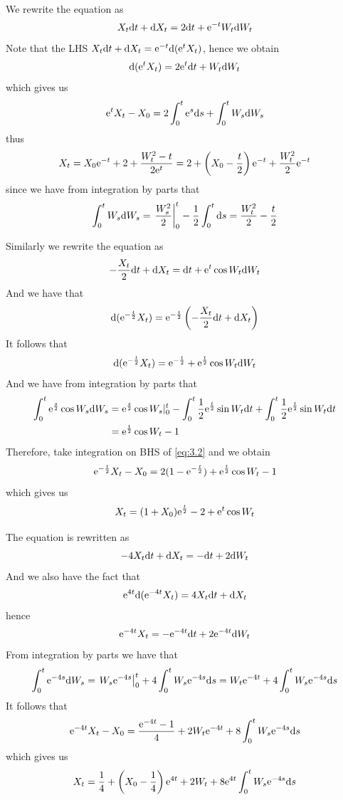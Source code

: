 \documentclass{homework}
\begin{document}
    \problem
    \begin{subproblem}[(3.\arabic*)]
        \item
        We rewrite the equation as
        \[X_t\mathrm d t+\mathrm d X_t=2\mathrm d t+\mathrm e^{-t}W_t\mathrm d W_t\]
        Note that the LHS $X_t\mathrm d t+\mathrm d X_t=\mathrm e^{-t}\mathrm d (\mathrm e^tX_t)$,
        hence we obtain
        \[\mathrm d (\mathrm e^t X_t)=2\mathrm e^t\mathrm d t+W_t\mathrm d W_t\]
        which gives us
        \[\mathrm e^tX_t-X_0=2\int_0^t\mathrm e^s\mathrm d s+\int_0^tW_s\mathrm d W_s\]
        thus
        \[X_t=X_0\mathrm e^{-t}+2+\frac{W_t^2-t}{2\mathrm e^t}
        =2+\left(X_0-\frac{t}{2}\right)\mathrm e^{-t}+\frac{W_t^2}{2}\mathrm e^{-t}\]
        since we have from integration by parts that
        \[\int_0^tW_s\mathrm d W_s=\left.\frac{W_s^2}{2}\right|_0^t
        -\frac{1}{2}\int_0^t\mathrm d s=\frac{W_t^2}{2}-\frac{t}{2}\]
       
        \item
        Similarly we rewrite the equation as
        \[-\frac{X_t}{2}\mathrm d t+\mathrm d X_t=\mathrm d t+\mathrm e^t\cos W_t\mathrm d W_t\]
        And we have that
        \[\mathrm d(\mathrm e^{-\frac{t}{2}}X_t)
        =\mathrm e^{-\frac{t}{2}}\left(-\frac{X_t}{2}\mathrm d t+\mathrm d X_t\right)\]
        It follows that
        \begin{equation}
            \label{eq:3.2}    
            \mathrm d (\mathrm e^{-\frac{t}{2}}X_t)=\mathrm e^{-\frac{t}{2}}+\mathrm e^{\frac{t}{2}}\cos W_t\mathrm d W_t
        \end{equation}
        And we have from integration by parts that
        \[\begin{aligned}
            \int_0^t\mathrm e^{\frac{s}{2}}\cos W_s\mathrm d W_s
            &=\mathrm e^{\frac{s}{2}}\cos W_s|_0^t
            -\int_0^t\frac{1}{2}\mathrm e^{\frac{t}{2}}\sin W_t\mathrm d t
            +\int_0^t\frac{1}{2}\mathrm e^{\frac{t}{2}}\sin W_t\mathrm d t\\
            &=\mathrm e^{\frac{t}{2}}\cos W_t-1
        \end{aligned}\]
        Therefore, take integration on BHS of \cref{eq:3.2} and we obtain
        \[\mathrm e^{-\frac{t}{2}}X_t-X_0=2(1-\mathrm e^{-\frac{t}{2}})+\mathrm e^{\frac{t}{2}}\cos W_t-1\]
        which gives us
        \[X_t=(1+X_0)\mathrm e^{\frac{t}{2}}-2+\mathrm e^t\cos W_t\]
        
        \item
        The equation is rewritten as
        \[-4X_t\mathrm d t+\mathrm d X_t=-\mathrm d t+2\mathrm d W_t\]
        And we also have the fact that
        \[\mathrm e^{4t}\mathrm d(\mathrm e^{-4t}X_t)=4X_t\mathrm d t+\mathrm d X_t\]
        hence
        \[\mathrm e^{-4t}X_t=-\mathrm e^{-4t}\mathrm d t+2\mathrm e^{-4t}\mathrm d W_t\]
        From integration by parts we have that
        \[\int_0^t\mathrm e^{-4s}\mathrm d W_s=\left.W_s\mathrm e^{-4s}\right|_0^t
        +4\int_0^tW_s\mathrm e^{-4s}\mathrm d s
        =W_t\mathrm e^{-4t}+4\int_0^tW_s\mathrm e^{-4s}\mathrm d s\]
        It follows that
        \[\mathrm e^{-4t}X_t-X_0=\frac{\mathrm e^{-4t}-1}{4}+2W_t\mathrm e^{-4t}+8\int_0^tW_s\mathrm e^{-4s}\mathrm d s\]
        which gives us
        \[X_t=\frac{1}{4}+\left(X_0-\frac{1}{4}\right)\mathrm e^{4t}+2W_t
        +8\mathrm e^{4t}\int_0^tW_s\mathrm e^{-4s}\mathrm d s\]

    \end{subproblem}
\end{document}
